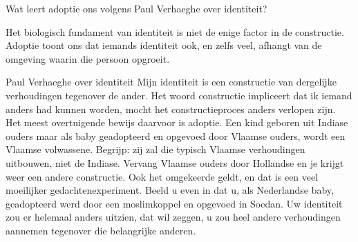 \documentclass[main.tex]{subfiles}
\begin{document}
\begin{examenvraag}
    \begin{vraag}
        Wat leert adoptie ons volgens Paul Verhaeghe over identiteit?
    \end{vraag}

    \begin{antwoord}
        Het biologisch fundament van identiteit is niet de enige factor in de constructie.
        Adoptie toont ons dat iemands identiteit ook, en zelfs veel, afhangt van de omgeving waarin die persoon opgroeit.
        \begin{citaat}{Paul Verhaeghe over identiteit}
            Mijn identiteit is een constructie van dergelijke verhoudingen tegenover de ander.
            Het woord constructie impliceert dat ik iemand anders had kunnen worden, mocht het constructieproces anders verlopen zijn.
            Het meest overtuigende bewijs daarvoor is adoptie.
            Een kind geboren uit Indiase ouders maar als baby geadopteerd en opgevoed door Vlaamse ouders, wordt een Vlaamse volwassene.
            Begrijp: zij zal die typisch Vlaamse verhoudingen uitbouwen, niet de Indiase.
            Vervang Vlaamse ouders door Hollandse en je krijgt weer een andere constructie.
            Ook het omgekeerde geldt, en dat is een veel moeilijker gedachtenexperiment.
            Beeld u even in dat u, als Nederlandse baby, geadopteerd werd door een moslimkoppel en opgevoed in Soedan. 
            Uw identiteit zou er helemaal anders uitzien, dat wil zeggen, u zou heel andere verhoudingen aannemen tegenover die belangrijke anderen.
        \end{citaat}
    \end{antwoord}
\end{examenvraag}
\end{document}
